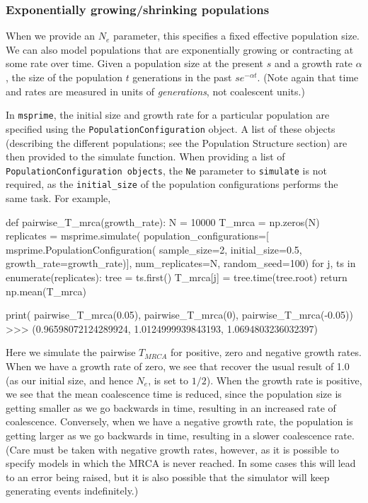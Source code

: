 \documentclass[graybox]{svmult}
\newcommand{\msprime}[0]{\texttt{msprime}}
\begin{document}
\subsubsection{Exponentially growing/shrinking
populations}\label{exponentially-growingshrinking-populations}

When we provide an \(N_e\) parameter, this specifies a fixed effective
population size. We can also model populations that are exponentially
growing or contracting at some rate over time. Given a population size
at the present \(s\) and a growth rate \(\alpha\), the size of the
population \(t\) generations in the past \(s e^{-\alpha t}\). (Note
again that time and rates are measured in units of \emph{generations},
not coalescent units.)

In \msprime, the initial size and growth rate for a particular population
are specified using the \texttt{PopulationConfiguration} object. A list
of these objects (describing the different populations; see the
Population Structure section) are then provided to the simulate
function. When providing a list of
\texttt{PopulationConfiguration\ objects}, the \texttt{Ne} parameter to
\texttt{simulate} is not required, as the \texttt{initial\_size} of the
population configurations performs the same task. For example,

\begin{pythoncode}
def pairwise_T_mrca(growth_rate):
    N = 10000
    T_mrca = np.zeros(N)
    replicates = msprime.simulate(
        population_configurations=[
             msprime.PopulationConfiguration(
                sample_size=2, initial_size=0.5,
                growth_rate=growth_rate)],
        num_replicates=N, random_seed=100)
    for j, ts in enumerate(replicates):
        tree = ts.first()
        T_mrca[j] = tree.time(tree.root)
    return np.mean(T_mrca)

print(
    pairwise_T_mrca(0.05), pairwise_T_mrca(0),
    pairwise_T_mrca(-0.05))
>>> (0.96598072124289924, 1.0124999939843193, 1.0694803236032397)
\end{pythoncode}

    Here we simulate the pairwise \(T_{MRCA}\) for positive, zero and
negative growth rates. When we have a growth rate of zero, we see that
recover the usual result of 1.0 (as our initial size, and hence \(N_e\),
is set to \(1/2\)). When the growth rate is positive, we see that the
mean coalescence time is reduced, since the population size is getting
smaller as we go backwards in time, resulting in an increased rate of
coalescence. Conversely, when we have a negative growth rate, the
population is getting larger as we go backwards in time, resulting in a
slower coalescence rate. (Care must be taken with negative growth rates,
however, as it is possible to specify models in which the MRCA is never
reached. In some cases this will lead to an error being raised, but it
is also possible that the simulator will keep generating events
indefinitely.)
\end{document}
